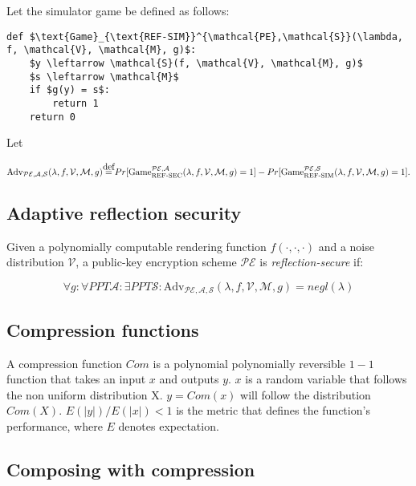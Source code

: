 \documentclass{article}
\newcommand\defeq{\stackrel{\mathclap{\normalfont\mbox{def}}}{=}}
\begin{document}
Let the simulator game be defined as follows:

\begin{lstlisting}[texcl,mathescape]
def $\text{Game}_{\text{REF-SIM}}^{\mathcal{PE},\mathcal{S}}(\lambda, f, \mathcal{V}, \mathcal{M}, g)$:
    $y \leftarrow \mathcal{S}(f, \mathcal{V}, \mathcal{M}, g)$
    $s \leftarrow \mathcal{M}$
    if $g(y) = s$:
        return 1
    return 0
\end{lstlisting}

Let

\begin{equation*}
    \text{Adv}_{\mathcal{PE}, \mathcal{A}, \mathcal{S}}(\lambda, f, \mathcal{V}, \mathcal{M}, g)
    \defeq
    Pr[\text{Game}_{\text{REF-SEC}}^{\mathcal{PE},\mathcal{A}}(\lambda, f, \mathcal{V}, \mathcal{M}, g) = 1]
    -
    Pr[\text{Game}_{\text{REF-SIM}}^{\mathcal{PE},\mathcal{S}}(\lambda, f, \mathcal{V}, \mathcal{M}, g) = 1].
\end{equation*}

\subsection*{Adaptive reflection security}

Given a polynomially computable rendering function $f(\cdot, \cdot, \cdot)$ and
a  noise distribution $\mathcal{V}$, a public-key encryption scheme
$\mathcal{PE}$ is \textit{reflection-secure} if:

\begin{equation*}
\forall g:
\forall PPT \mathcal{A}:
\exists PPT \mathcal{S}:
\text{Adv}_{\mathcal{PE}, \mathcal{A}, \mathcal{S}}(\lambda, f, \mathcal{V}, \mathcal{M}, g) = negl(\lambda)
\end{equation*}

\subsection*{Compression functions}

A compression function $Com$ is a polynomial polynomially reversible $1 - 1$
function that takes an input $x$ and outputs $y$. $x$ is a random variable that
follows the non uniform distribution X. $y = Com(x)$ will follow the
distribution $Com(X)$.  $E(|y|) / E(|x|) < 1$ is the metric that defines the
function's performance, where $E$ denotes expectation.

\subsection*{Composing with compression}
\end{document}
